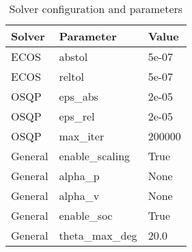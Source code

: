 \begin{table}[t]
\centering
\begin{tabular}{lll}
\toprule
Solver & Parameter & Value \\
\midrule
ECOS & abstol & 5e-07 \\
ECOS & reltol & 5e-07 \\
OSQP & eps_abs & 2e-05 \\
OSQP & eps_rel & 2e-05 \\
OSQP & max_iter & 200000 \\
General & enable_scaling & True \\
General & alpha_p & None \\
General & alpha_v & None \\
General & enable_soc & True \\
General & theta_max_deg & 20.0 \\
\bottomrule
\end{tabular}
\caption{Solver configuration and parameters}
\label{tab:solver_settings}
\end{table}
